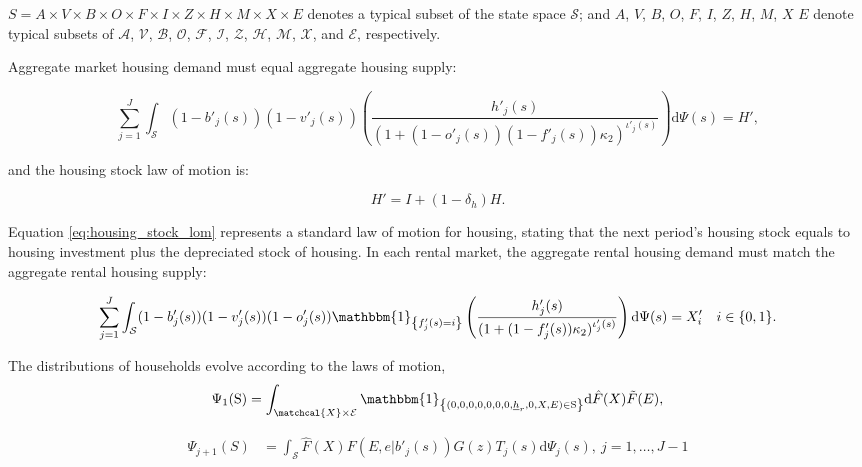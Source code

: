 \documentclass[parskip=full]{article}
\newcommand{\indicator}[1]{\mathbbm{1}_{\left\{ {#1} \right\} }}
\begin{document}
$S=A\times V\times B\times O \times F \times I \times Z \times H\times M\times X \times E$ denotes a typical subset of the state space $\mathcal{S}$; and $A$, $V$, $B$, $O$, $F$, $I$, $Z$, $H$, $M$, $X$ $E$ denote typical subsets of $\mathcal{A}$, $\mathcal{V}$, $\mathcal{B}$, $\mathcal{O}$, $\mathcal{F}$, $\mathcal{I}$, $\mathcal{Z}$, $\mathcal{H}$, $\mathcal{M}$, $\mathcal{X}$, and $\mathcal{E}$, respectively.

Aggregate market housing demand must equal aggregate housing supply:

\begin{equation}
\label{eq:housing_clearing_condition}
  \sum_{j=1}^J \int_\mathcal{S} (1-b'_{j}(s))(1-v'_{j}(s)) \left(\frac{h'_{j}(s)}{(1+(1-o'_{j}(s))(1-f'_{j}(s))\kappa_{2})^{\iota'_{j}(s)}}\right) \mathrm{d}\Psi(s) = H',
\end{equation}

\noindent and the housing stock law of motion is: 

\begin{equation}\label{eq:housing_stock_lom}
H'=I+(1-\delta_h)H.
\end{equation}


\noindent Equation \eqref{eq:housing_stock_lom} represents a standard law of motion for housing, stating that the next period's housing stock equals to housing investment plus the depreciated stock of housing. In each rental market, the aggregate rental housing demand must match the aggregate rental housing supply:

\begin{equation}
\label{eq:rental_housing_clearing_condition}
  \sum_{j=1}^J \int_\mathcal{S} (1-b'_{j}(s))(1-v'_{j}(s)) (1-o'_{j}(s))\indicator{f'_{j}(s)=i}\left(\frac{h'_{j}(s)}{(1+(1-f'_{j}(s))\kappa_{2})^{\iota'_{j}(s)}}\right) \mathrm{d}\Psi(s) = X'_{i} \quad i \in \{0,1\}.
\end{equation}

The distributions of households evolve according to the laws of motion,
\begin{align}\label{eq:lom1}
\Psi_{1}(\mathrm{S})=\int_{\matchcal{X} \times \mathcal{E}} \indicator{(0,0,0,0,0,0,0,\underline{h}_{r},0,X,E)\in \mathrm{S}}\mathrm{d} \hat{F}(X)\tilde{F}(E),
\end{align}

\begin{align}
\Psi_{j+1}(S) &=\int_{\mathcal{S}} \hat{F}(X)F(E,e|b'_{j}(s))G(z)T_{j}(s)\mathrm{d}\Psi_{j}(s),\ j=1,\ldots,J-1\label{eq:lom2}
\end{align}
\end{document}
